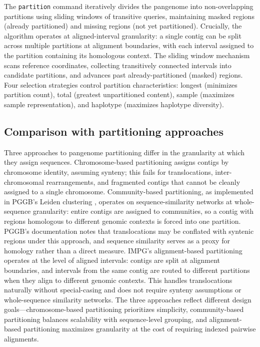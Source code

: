 The \texttt{partition} command iteratively divides the pangenome into non-overlapping partitions using sliding windows of transitive queries, maintaining masked regions (already partitioned) and missing regions (not yet partitioned). Crucially, the algorithm operates at aligned-interval granularity: a single contig can be split across multiple partitions at alignment boundaries, with each interval assigned to the partition containing its homologous context. The sliding window mechanism scans reference coordinates, collecting transitively connected intervals into candidate partitions, and advances past already-partitioned (masked) regions. Four selection strategies control partition characteristics: longest (minimizes partition count), total (greatest unpartitioned content), sample (maximizes sample representation), and haplotype (maximizes haplotype diversity).

\subsection*{Comparison with partitioning approaches}

Three approaches to pangenome partitioning differ in the granularity at which they assign sequences. Chromosome-based partitioning assigns contigs by chromosome identity, assuming synteny; this fails for translocations, inter-chromosomal rearrangements, and fragmented contigs that cannot be cleanly assigned to a single chromosome. Community-based partitioning, as implemented in PGGB's Leiden clustering \cite{Garrison2024}, operates on sequence-similarity networks at whole-sequence granularity: entire contigs are assigned to communities, so a contig with regions homologous to different genomic contexts is forced into one partition. PGGB's documentation notes that translocations may be conflated with syntenic regions under this approach, and sequence similarity serves as a proxy for homology rather than a direct measure. IMPG's alignment-based partitioning operates at the level of aligned intervals: contigs are split at alignment boundaries, and intervals from the same contig are routed to different partitions when they align to different genomic contexts. This handles translocations naturally without special-casing and does not require synteny assumptions or whole-sequence similarity networks. The three approaches reflect different design goals---chromosome-based partitioning prioritizes simplicity, community-based partitioning balances scalability with sequence-level grouping, and alignment-based partitioning maximizes granularity at the cost of requiring indexed pairwise alignments.


